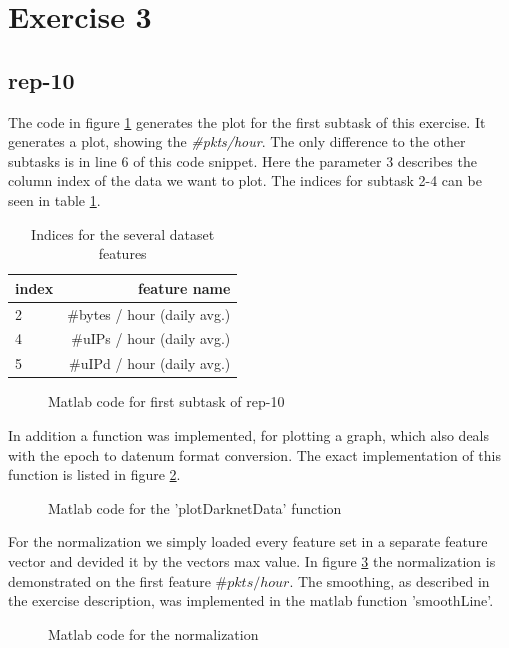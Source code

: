 \section*{Exercise 3}
\subsection*{rep-10}
The code in figure \ref{fig:rep10} generates the plot for the first subtask of this exercise. It generates a plot, showing the \textit{\#pkts/hour}. The only difference to the other subtasks is in line 6 of this code snippet. Here the parameter 3 describes the column index of the data we want to plot. The indices for subtask 2-4 can be seen in table \ref{tab:indices}.
\begin{table}[H]
\center
\begin{tabular}{lr}
\toprule
index & feature name \\
\midrule
2 & \#bytes / hour (daily avg.) \\
4 & \#uIPs / hour (daily avg.) \\
5 & \#uIPd / hour (daily avg.) \\
\bottomrule
\end{tabular}
\caption{Indices for the several dataset features}
\label{tab:indices}
\end{table}
\begin{figure}[H]

\caption{Matlab code for first subtask of rep-10}
\label{fig:rep10}
\end{figure}

In addition a function was implemented, for plotting a graph, which also deals with the epoch to datenum format conversion. The exact implementation of this function is listed in figure \ref{fig:plotDarkNetData}.

\begin{figure}[H]

\caption{Matlab code for the 'plotDarknetData' function}
\label{fig:plotDarkNetData}
\end{figure}

For the normalization we simply loaded every feature set in a separate feature vector and devided it by the vectors max value. In figure \ref{fig:normalization} the normalization is demonstrated on the first feature \(\#pkts/hour\). The smoothing, as described in the exercise description, was implemented in the matlab function 'smoothLine'.

\begin{figure}[H]

\caption{Matlab code for the normalization}
\label{fig:normalization}
\end{figure}


